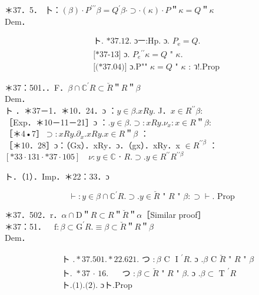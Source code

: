 \documentclass[10pt]{article}
\begin{document}
＊37．5． 卜：$(\beta) \cdot P^{\prime \prime \prime} \beta=Q^{\prime} \beta \cdot \supset \cdot(\kappa) \cdot P$＂$\kappa=Q$＂$\kappa$\\
Dem．

$$
\begin{aligned}
& \text { ト. *37.12. ɔㅡ:Hp. ɔ. } P_{\mathrm{e}}=Q \text {. } \\
& \text { [*37-13] ɔ. } P_{e}{ }^{\prime \prime} \kappa=Q \text { " } \kappa \text {. } \\
& \text { [(*37.04)] ɔ.P"" } \kappa=Q \text { " } \kappa \text { : ว!.Prop }
\end{aligned}
$$

＊37：501．．F．$\beta \cap \mathbb{C}^{\prime} R \subset \breve{R}$＂$R$＂$\beta$\\
Dem．\\
ト ．＊37－1．＊10．24．ɔ ：$y \in \beta . x R y$. J．$x \in R^{\prime \prime} \beta:$\\
［Exp．＊10－11－21］ɔ ：$. y \in \beta . \supset: x R y . \nu_{x}: x \in R$＂$\beta:$\\
［＊4•7］$\supset: x R y . \partial_{x} . x R y . x \in R$＂$\beta$ ：\\
［＊10．28］ɔ：（Gx）．xRy．ɔ．（gx）．xRy．x $\in R^{\prime \prime \beta}$ ：\\
$[* 33 \cdot 131 \cdot * 37 \cdot 105] \quad \nu: y \in \mathbb{C}$ ⋅ $R . \supset . y \in R^{\prime \prime} R^{\prime \prime \beta}$

ト．（1）．Imp．＊22：33．ɔ


\begin{equation*}
\vdash: y \in \beta \cap \mathbb{C}^{\prime} R . \supset . y \in \breve{R} \text { " } R \text { " } \beta: \supset \vdash . \text { Prop } \tag{1}
\end{equation*}


＊37．502．r．$\alpha \cap \mathrm{D}$＂$R \subset R$＂$\breve{R}$＂$\alpha$［Similar proof］\\
＊37：51．$\quad \mathrm{f}: \beta \subset \mathrm{G}^{\prime} R . \equiv \beta \subset \breve{R}$＂$R$＂$\beta$\\
Dem．


\begin{align*}
& \text { ト } . * 37.501 . * 22.621 . \text { つ }: \beta \text { C } \text { I }^{\prime} R . \text { ɔ } . \beta \text { C } \breve{R} \text { " } R \text { " } \beta  \tag{1}\\
& \text { ト. } * 37 \text { ⋅ 16. } \quad \text { つ }: \beta \subset \breve{R} \text { " } R \text { " } \beta . \text { ɔ } . \beta \subset \text { T }^{\prime} R  \tag{2}\\
& \text { ト.(1).(2). ɔト.Prop }
\end{align*}
\end{document}
